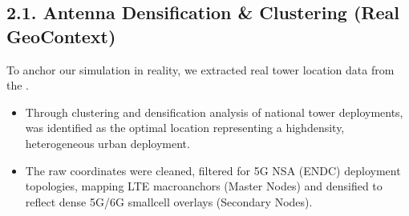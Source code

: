\documentclass[letterpaper,10pt,english]{sphinxmanual}
\begin{document}
\subsection{2.1. Antenna Densification \& Clustering (Real Geo\sphinxhyphen{}Context)}
\label{\detokenize{dataset:antenna-densification-clustering-real-geo-context}}
\sphinxAtStartPar
To anchor our simulation in reality, we extracted real tower location data from the .
\begin{itemize}
\item {} 
\sphinxAtStartPar
{} Through clustering and densification analysis of national tower deployments,  was identified as the optimal location representing a high\sphinxhyphen{}density, heterogeneous urban deployment.

\item {} 
\sphinxAtStartPar
{} The raw coordinates were cleaned, filtered for 5G NSA (EN\sphinxhyphen{}DC) deployment topologies, mapping LTE macro\sphinxhyphen{}anchors (Master Nodes) and densified to reflect dense 5G/6G small\sphinxhyphen{}cell overlays (Secondary Nodes).

\end{itemize}
\end{document}
